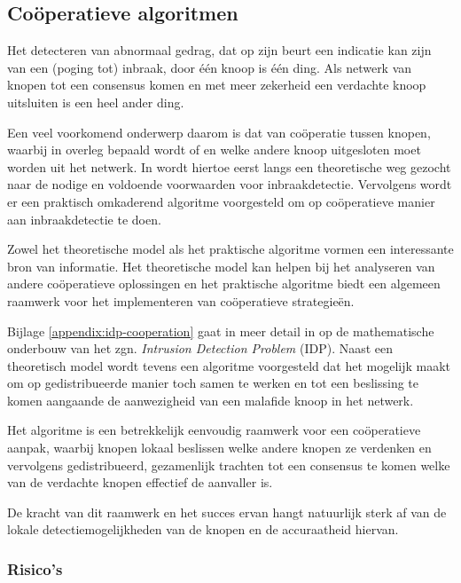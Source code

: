 \subsection{Co\"operatieve algoritmen}
\label{subsection:cooperation}

Het detecteren van abnormaal gedrag, dat op zijn beurt een indicatie kan zijn
van een (poging tot) inbraak, door \'e\'en knoop is \'e\'en ding. Als netwerk
van knopen tot een consensus komen en met meer zekerheid een verdachte knoop
uitsluiten is een heel ander ding.

Een veel voorkomend onderwerp daarom is dat van co\"operatie tussen knopen,
waarbij in overleg bepaald wordt of en welke andere knoop uitgesloten moet
worden uit het netwerk. In \citep{krontiris2009cooperative} wordt hiertoe eerst
langs een theoretische weg gezocht naar de nodige en voldoende voorwaarden voor
inbraakdetectie. Vervolgens wordt er een praktisch omkaderend algoritme
voorgesteld om op co\"operatieve manier aan inbraakdetectie te doen.

Zowel het theoretische model als het praktische algoritme vormen een
interessante bron van informatie. Het theoretische model kan helpen bij het
analyseren van andere co\"operatieve oplossingen en het praktische algoritme
biedt een algemeen raamwerk voor het implementeren van co\"operatieve
strategie\"en.

Bijlage \ref{appendix:idp-cooperation} gaat in meer detail in op de
mathematische onderbouw van het zgn. \emph{Intrusion Detection Problem} (IDP).
Naast een theoretisch model wordt tevens een algoritme voorgesteld dat het
mogelijk maakt om op gedistribueerde manier toch samen te werken en tot een
beslissing te komen aangaande de aanwezigheid van een malafide knoop in het
netwerk.

Het algoritme is een betrekkelijk eenvoudig raamwerk voor een co\"operatieve
aanpak, waarbij knopen lokaal beslissen welke andere knopen ze verdenken en
vervolgens gedistribueerd, gezamenlijk trachten tot een consensus te komen
welke van de verdachte knopen effectief de aanvaller is.

De kracht van dit raamwerk en het succes ervan hangt natuurlijk sterk af van de
lokale detectiemogelijkheden van de knopen en de accuraatheid hiervan.

\subsubsection*{Risico's}

